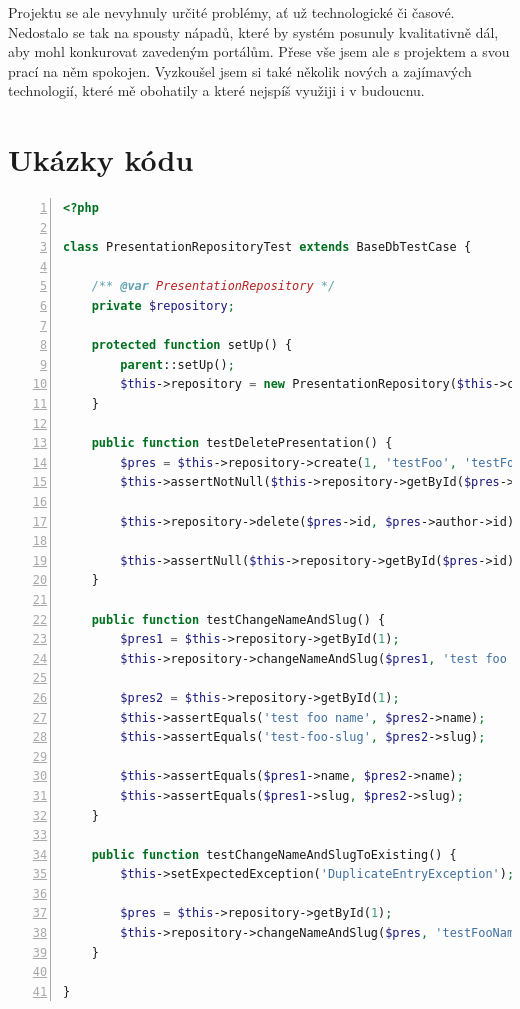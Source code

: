 \documentclass[11pt,twoside,a4paper]{book}
\begin{document}
Projektu se ale nevyhnuly určité problémy, ať už technologické či časové. Nedostalo se tak na spousty nápadů, které by systém posunuly kvalitativně dál, aby mohl konkurovat zavedeným portálům. Přese vše jsem ale s projektem a svou prací na něm spokojen. Vyzkoušel jsem si také několik nových a zajímavých technologií, které mě obohatily a které nejspíš využiji i v budoucnu.





{
\def\CS{$\cal C\kern-0.1667em\lower.5ex\hbox{$\cal S$}\kern-0.075em $}

}




\appendix	

\printnomenclature

\chapter{Ukázky kódu}\label{chap:ukazkykodu}


\begin{lstlisting}[caption={Ukázka integračních testů},label={lst:integrationtest},
language=php,
numbers=left,
breaklines=true]
<?php

class PresentationRepositoryTest extends BaseDbTestCase {

	/** @var PresentationRepository */
	private $repository;

	protected function setUp() {
		parent::setUp();
		$this->repository = new PresentationRepository($this->container->database);
	}

	public function testDeletePresentation() {
		$pres = $this->repository->create(1, 'testFoo', 'testFoo');
		$this->assertNotNull($this->repository->getById($pres->id));

		$this->repository->delete($pres->id, $pres->author->id);

		$this->assertNull($this->repository->getById($pres->id));
	}

	public function testChangeNameAndSlug() {
		$pres1 = $this->repository->getById(1);
		$this->repository->changeNameAndSlug($pres1, 'test foo name', 'test foo slug');

		$pres2 = $this->repository->getById(1);
		$this->assertEquals('test foo name', $pres2->name);
		$this->assertEquals('test-foo-slug', $pres2->slug);

		$this->assertEquals($pres1->name, $pres2->name);
		$this->assertEquals($pres1->slug, $pres2->slug);
	}

	public function testChangeNameAndSlugToExisting() {
		$this->setExpectedException('DuplicateEntryException');

		$pres = $this->repository->getById(1);
		$this->repository->changeNameAndSlug($pres, 'testFooName', 'test2');
	}

}
\end{lstlisting}
\end{document}
